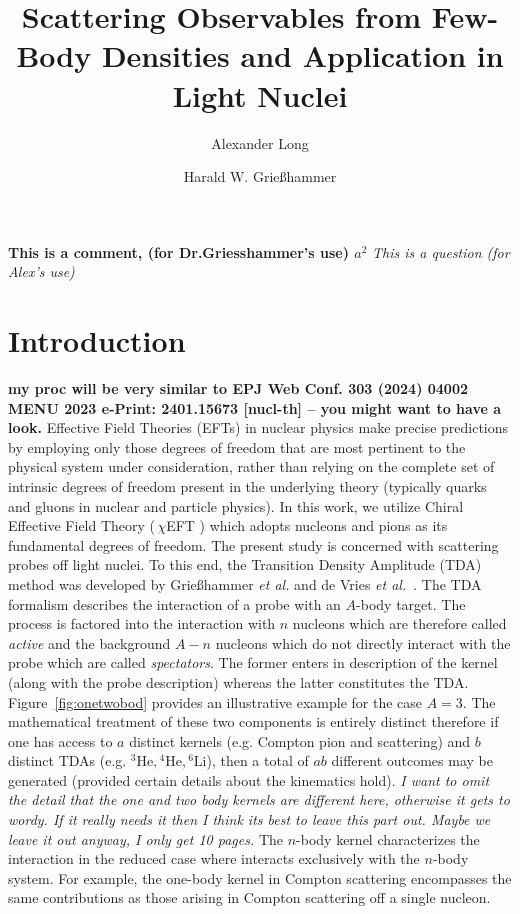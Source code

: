 \documentclass[a4paper,11pt]{article}
\title{Scattering Observables from Few-Body Densities and Application
in Light Nuclei}
\author*{Alexander Long}
\author{Harald W. Grie{\ss}hammer}
\affiliation{Institute for Nuclear Studies, Department of
Physics,\\George Washington University, Washington DC 20052, USA}
\newcommand{\LiS}{{}^{6} \mathrm{Li} }
\newcommand{\HeF}{{}^{4} \mathrm{He}}
\newcommand{\HeT}{{}^{3} \mathrm{He}}
\newcommand{\ques}[1]{\color{red}\textit{ #1 }\color{black}}
\newcommand{\com}[1]{\color{blue}\small\textbf{ #1 }\color{black}\normalsize}
\newcommand{\ChiEFT}{\,$\chi$EFT\,\,}
\begin{document}
\maketitle
\com{This is a comment, (for Dr.Griesshammer's use) $a^2$}
\ques{This is a question (for Alex's use)}
\section{Introduction}
\com{my proc will be very similar to 
    EPJ Web Conf. 303 (2024) 04002
        MENU 2023
e-Print:    2401.15673 [nucl-th] -- you might want to have a look.}
Effective Field Theories (EFTs) in nuclear physics make precise predictions by employing only those
degrees of freedom that are most pertinent to the physical system
under consideration, rather than relying on the complete set of
intrinsic degrees of freedom present in the underlying theory
(typically quarks and gluons in nuclear and particle physics). In this work, we utilize Chiral
Effective Field Theory (\ChiEFT) which adopts nucleons and pions
as its fundamental degrees of freedom.
The present study is concerned with scattering probes off
light nuclei. To this end, the Transition Density Amplitude (TDA)
method was developed by Grie\ss hammer \textit{et al.} and de Vries
\textit{et al.}~\cite{hammer2020, Vries2024}. The TDA formalism
describes the interaction of a probe with an $A$-body target.
The process is factored into the interaction with $n$ nucleons  which are therefore called \textit{active}
and the background $A-n$ nucleons which do not directly interact with the probe which are called \textit{spectators}.
The former enters in description of the kernel (along with the probe description) whereas the latter constitutes the TDA.
Figure~\ref{fig:onetwobod} provides an illustrative
example for the case $A=3$.
The mathematical treatment of these two components is entirely distinct
therefore if one has access to $a$ distinct kernels (e.g. Compton pion and scattering)
and $b$ distinct TDAs (e.g. $\HeT, \HeF, \LiS$), then a total of $ab$ different outcomes may be
generated (provided certain details about the kinematics hold). 
\ques{I want to omit the detail that the one and two body kernels are different here, otherwise it gets to wordy. If it really needs
it then I think its best to leave this part out. Maybe we leave it out anyway, I only get 10 pages.}
The $n$-body kernel characterizes the interaction in the reduced case
where interacts exclusively with the $n$-body
system. For example, the one-body kernel in Compton scattering
encompasses the same contributions as those arising in Compton
scattering off a single nucleon. 
\end{document}
